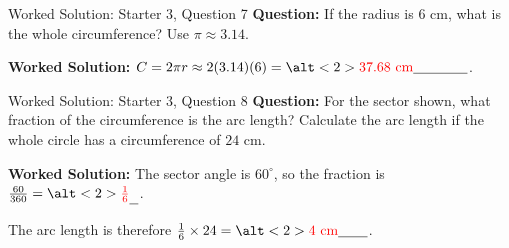 \documentclass{beamer}
\newcommand{\ablank}[1]{%
  \alt<2>{\textcolor{red}{#1}}{\underline{\phantom{#1}}}%
}
\begin{document}
\begin{frame}{Worked Solution: Starter 3, Question 7}
\small
\textbf{Question:} If the radius is \(6\) cm, what is the whole circumference? Use \(\pi\approx3.14\).

\textbf{Worked Solution:} \(C=2\pi r\approx2(3.14)(6)=\ablank{37.68\text{ cm}}\).
\end{frame}

\begin{frame}{Worked Solution: Starter 3, Question 8}
\small
\textbf{Question:} For the sector shown, what fraction of the circumference is the arc length? Calculate the arc length if the whole circle has a circumference of \(24\) cm.

\textbf{Worked Solution:} The sector angle is \(60^\circ\), so the fraction is
\(\frac{60}{360}=\ablank{\frac16}\).

The arc length is therefore
\(\frac16\times24=\ablank{4\text{ cm}}\).
\end{frame}
\end{document}
